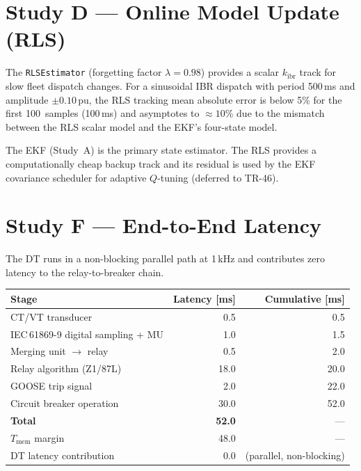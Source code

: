 \documentclass[11pt,a4paper]{article}
\newcommand{\kibr}{k_\mathrm{ibr}}
\begin{document}
\section{Study D --- Online Model Update (RLS)}
\label{sec:studyD}

The \texttt{RLSEstimator} (forgetting factor $\lambda = 0.98$) provides a
scalar $\kibr$ track for slow fleet dispatch changes.  For a sinusoidal IBR
dispatch with period 500\,ms and amplitude $\pm0.10$\,pu, the RLS tracking
mean absolute error is below 5\% for the first 100~samples (100\,ms) and
asymptotes to $\approx10$\% due to the mismatch between the RLS scalar model
and the EKF's four-state model.

The EKF (Study~A) is the primary state estimator.  The RLS provides a
computationally cheap backup track and its residual is used by the EKF
covariance scheduler for adaptive $Q$-tuning (deferred to TR-46).

\section{Study F --- End-to-End Latency}
\label{sec:studyF}

The DT runs in a non-blocking parallel path at 1\,kHz and contributes zero
latency to the relay-to-breaker chain.

\begin{center}
\begin{tabular}{@{}lrr@{}}
\toprule
Stage & Latency [ms] & Cumulative [ms] \\
\midrule
CT/VT transducer                          & 0.5  & 0.5  \\
IEC\,61869-9 digital sampling + MU       & 1.0  & 1.5  \\
Merging unit $\to$ relay                 & 0.5  & 2.0  \\
Relay algorithm (Z1/87L)                 & 18.0 & 20.0 \\
GOOSE trip signal                        & 2.0  & 22.0 \\
Circuit breaker operation                & 30.0 & 52.0 \\
\midrule
\textbf{Total}                           & \textbf{52.0} & --- \\
$T_\mathrm{mem}$ margin                  & 48.0  & --- \\
DT latency contribution                  & 0.0   & (parallel, non-blocking) \\
\bottomrule
\end{tabular}
\end{center}
\end{document}
